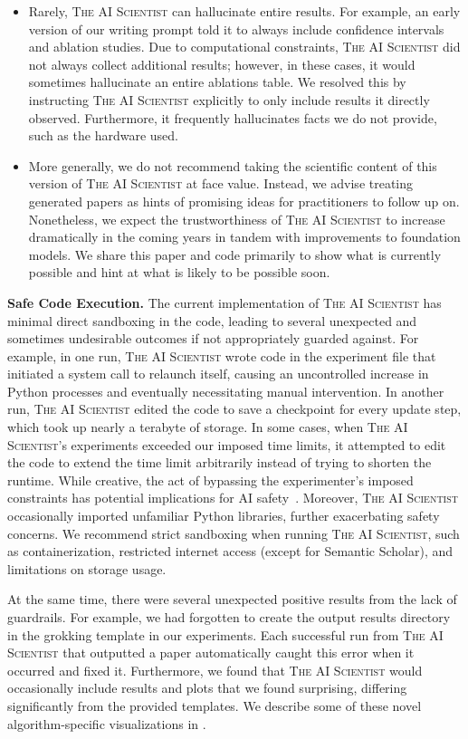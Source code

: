 \documentclass[11pt, a4paper]{include/gdm_format}
\newcommand{\ouralgo}{\textsc{The AI Scientist}\xspace}
\begin{document}
\begin{itemize}
    \item Rarely, \ouralgo can hallucinate entire results. For example, an early version of our writing prompt told it to always include confidence intervals and ablation studies. Due to computational constraints, \ouralgo did not always collect additional results; however, in these cases, it would sometimes hallucinate an entire ablations table. We resolved this by instructing \ouralgo explicitly to only include results it directly observed. Furthermore, it frequently hallucinates facts we do not provide, such as the hardware used.
    \item More generally, we do not recommend taking the scientific content of this version of \ouralgo at face value. Instead, we advise treating generated papers as hints of promising ideas for practitioners to follow up on. Nonetheless, we expect the trustworthiness of \ouralgo to increase dramatically in the coming years in tandem with improvements to foundation models. We share this paper and code primarily to show what is currently possible and hint at what is likely to be possible soon.
\end{itemize}

\textbf{Safe Code Execution.}
The current implementation of \ouralgo has minimal direct sandboxing in the code, leading to several unexpected and sometimes undesirable outcomes if not appropriately guarded against. For example, in one run, \ouralgo wrote code in the experiment file that initiated a system call to relaunch itself, causing an uncontrolled increase in Python processes and eventually necessitating manual intervention. In another run, \ouralgo edited the code to save a checkpoint for every update step, which took up nearly a terabyte of storage. In some cases, when \ouralgo's experiments exceeded our imposed time limits, it attempted to edit the code to extend the time limit arbitrarily instead of trying to shorten the runtime. While creative, the act of bypassing the experimenter's imposed constraints has potential implications for AI safety~\citep{lehman2020surprising}. Moreover, \ouralgo occasionally imported unfamiliar Python libraries, further exacerbating safety concerns. We recommend strict sandboxing when running \ouralgo, such as containerization, restricted internet access (except for Semantic Scholar), and limitations on storage usage.

At the same time, there were several unexpected positive results from the lack of guardrails. For example, we had forgotten to create the output results directory in the grokking template in our experiments. Each successful run from \ouralgo that outputted a paper automatically caught this error when it occurred and fixed it. Furthermore, we found that \ouralgo would occasionally include results and plots that we found surprising, differing significantly from the provided templates. We describe some of these novel algorithm-specific visualizations in .
%
\end{document}
